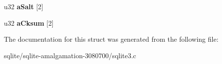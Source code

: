 \begin{DoxyCompactItemize}
\item 
\hypertarget{struct_wal_index_hdr_af99b92f673fd7ba1e4e4f9feb955453f}{u32 {\bfseries a\+Salt} \mbox{[}2\mbox{]}}\label{struct_wal_index_hdr_af99b92f673fd7ba1e4e4f9feb955453f}

\item 
\hypertarget{struct_wal_index_hdr_aa202339b02766d088717bfce9e3a9c0e}{u32 {\bfseries a\+Cksum} \mbox{[}2\mbox{]}}\label{struct_wal_index_hdr_aa202339b02766d088717bfce9e3a9c0e}

\end{DoxyCompactItemize}


The documentation for this struct was generated from the following file\+:\begin{DoxyCompactItemize}
\item 
sqlite/sqlite-\/amalgamation-\/3080700/sqlite3.\+c\end{DoxyCompactItemize}

